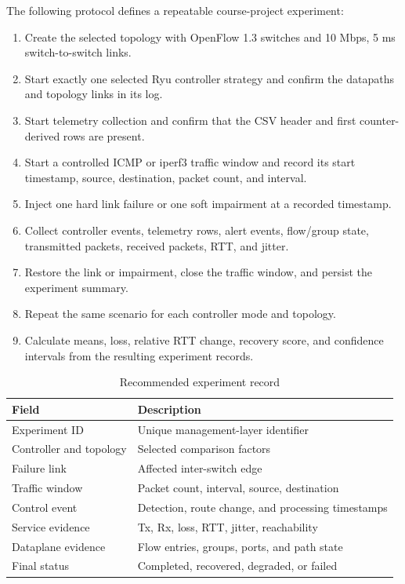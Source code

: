 \documentclass[conference]{IEEEtran}
\begin{document}
The following protocol defines a repeatable course-project experiment:
\begin{enumerate}
\item Create the selected topology with OpenFlow 1.3 switches and 10 Mbps,
  5 ms switch-to-switch links.
\item Start exactly one selected Ryu controller strategy and confirm the
  datapaths and topology links in its log.
\item Start telemetry collection and confirm that the CSV header and first
  counter-derived rows are present.
\item Start a controlled ICMP or iperf3 traffic window and record its start
  timestamp, source, destination, packet count, and interval.
\item Inject one hard link failure or one soft impairment at a recorded
  timestamp.
\item Collect controller events, telemetry rows, alert events, flow/group
  state, transmitted packets, received packets, RTT, and jitter.
\item Restore the link or impairment, close the traffic window, and persist
  the experiment summary.
\item Repeat the same scenario for each controller mode and topology.
\item Calculate means, loss, relative RTT change, recovery score, and
  confidence intervals from the resulting experiment records.
\end{enumerate}

\begin{table}[t]
\centering
\caption{Recommended experiment record}
\label{tab:record}
\begin{tabular}{p{}p{}}
\toprule
Field & Description\\
\midrule
Experiment ID & Unique management-layer identifier\\
Controller and topology & Selected comparison factors\\
Failure link & Affected inter-switch edge\\
Traffic window & Packet count, interval, source, destination\\
Control event & Detection, route change, and processing timestamps\\
Service evidence & Tx, Rx, loss, RTT, jitter, reachability\\
Dataplane evidence & Flow entries, groups, ports, and path state\\
Final status & Completed, recovered, degraded, or failed\\
\bottomrule
\end{tabular}
\end{table}
\end{document}
